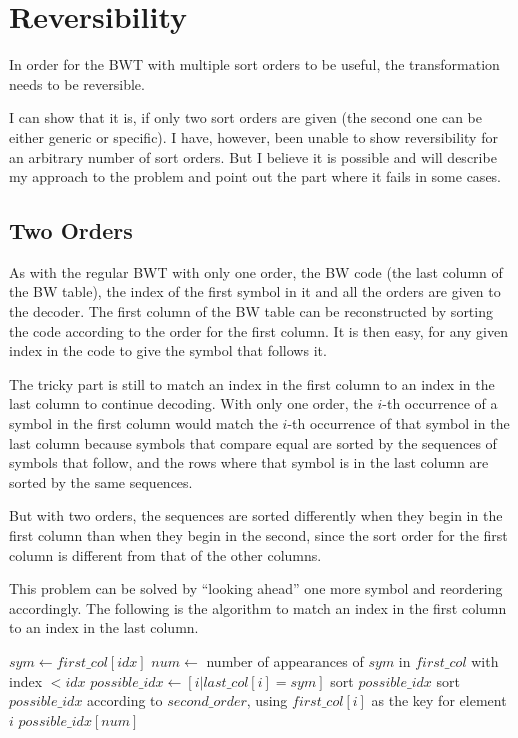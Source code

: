 \documentclass[a4paper]{scrreprt}
\begin{document}
\section{Reversibility}

In order for the BWT with multiple sort orders to be useful, the transformation
needs to be reversible.

I can show that it is, if only two sort orders are given (the second one can be
either generic or specific). I have, however, been unable to show reversibility
for an arbitrary number of sort orders. But I believe it is possible and will
describe my approach to the problem and point out the part where it fails in
some cases.

\subsection{Two Orders}

As with the regular BWT with only one order, the BW code (the last column of
the BW table), the index of the first symbol in it and all the orders are given
to the decoder. The first column of the BW table can be reconstructed by sorting
the code according to the order for the first column. It is then easy, for any
given index in the code to give the symbol that follows it.

The tricky part is still to match an index in the first column to an index in
the last column to continue decoding. With only one order, the \(i\)-th
occurrence of a symbol in the first column would match the \(i\)-th occurrence
of that symbol in the last column because symbols that compare equal are sorted
by the sequences of symbols that follow, and the rows where that symbol is in
the last column are sorted by the same sequences.

But with two orders, the sequences are sorted differently when they begin in the
first column than when they begin in the second, since the sort order for the
first column is different from that of the other columns.

This problem can be solved by ``looking ahead'' one more symbol and reordering
accordingly. The following is the algorithm to match an index in the first
column to an index in the last column.

\begin{algorithm}
\begin{algorithmic}[1]
\State $sym \gets first\_col[idx]$
\State $num \gets$ number of appearances of $sym$ in $first\_col$ with index $<
idx$
\State $possible\_idx \gets [i | last\_col[i] = sym]$
\State sort $possible\_idx$
\State sort $possible\_idx$ according to $second\_order$, using $first\_col[i]$
as the key for element $i$
\State \Return $possible\_idx[num]$
\EndProcedure
\end{algorithmic}
\end{algorithm}
\end{document}
